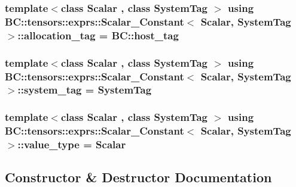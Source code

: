 \subsubsection[{\texorpdfstring{allocation\+\_\+tag}{allocation_tag}}]{\setlength{\rightskip}{0pt plus 5cm}template$<$class Scalar , class System\+Tag $>$ using {\bf B\+C\+::tensors\+::exprs\+::\+Scalar\+\_\+\+Constant}$<$ {\bf Scalar}, System\+Tag $>$\+::{\bf allocation\+\_\+tag} =  {\bf B\+C\+::host\+\_\+tag}}\hypertarget{structBC_1_1tensors_1_1exprs_1_1Scalar__Constant_a49b99255f1362355bba5114229f5341c}{}\label{structBC_1_1tensors_1_1exprs_1_1Scalar__Constant_a49b99255f1362355bba5114229f5341c}
\subsubsection[{\texorpdfstring{system\+\_\+tag}{system_tag}}]{\setlength{\rightskip}{0pt plus 5cm}template$<$class Scalar , class System\+Tag $>$ using {\bf B\+C\+::tensors\+::exprs\+::\+Scalar\+\_\+\+Constant}$<$ {\bf Scalar}, System\+Tag $>$\+::{\bf system\+\_\+tag} =  System\+Tag}\hypertarget{structBC_1_1tensors_1_1exprs_1_1Scalar__Constant_a8931dfee8e0cae0d760eb1fc0227921d}{}\label{structBC_1_1tensors_1_1exprs_1_1Scalar__Constant_a8931dfee8e0cae0d760eb1fc0227921d}
\subsubsection[{\texorpdfstring{value\+\_\+type}{value_type}}]{\setlength{\rightskip}{0pt plus 5cm}template$<$class Scalar , class System\+Tag $>$ using {\bf B\+C\+::tensors\+::exprs\+::\+Scalar\+\_\+\+Constant}$<$ {\bf Scalar}, System\+Tag $>$\+::{\bf value\+\_\+type} =  {\bf Scalar}}\hypertarget{structBC_1_1tensors_1_1exprs_1_1Scalar__Constant_a132ee57f3d537e185f9937eec1359759}{}\label{structBC_1_1tensors_1_1exprs_1_1Scalar__Constant_a132ee57f3d537e185f9937eec1359759}


\subsection{Constructor \& Destructor Documentation}
